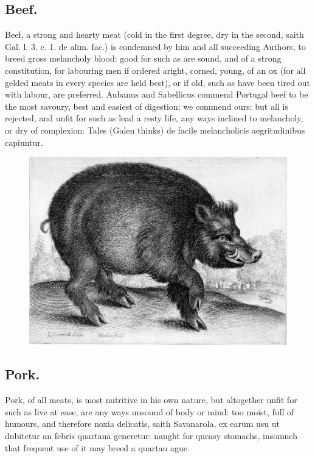 {{\subsection{Beef.}
Beef, a strong and hearty meat (cold in the first degree, dry
in the second, saith Gal. l. 3. c. 1. de alim. fac.) is condemned by
him and all succeeding Authors, to breed gross melancholy blood: good
for such as are sound, and of a strong constitution, for labouring men
if ordered aright, corned, young, of an ox (for all gelded meats in
every species are held best), or if old, such as have been tired
out with labour, are preferred. Aubanus and Sabellicus commend Portugal
beef to be the most savoury, best and easiest of digestion; we commend
ours: but all is rejected, and unfit for such as lead a resty life, any
ways inclined to melancholy, or dry of complexion: Tales (Galen thinks)
de facile melancholicis aegritudinibus capiuntur.
\begin{figure}[H]
  \begingroup
  \centering
  \includegraphics[keepaspectratio,width=\textwidth]{figures/wild-boar-small.jpg}
  \label{fig:wildboar}
\end{figure}
\subsection{Pork.}
Pork, of all meats, is most nutritive in his own nature,
 but altogether unfit for such as live at ease, are any ways
unsound of body or mind: too moist, full of humours, and therefore
noxia delicatis, saith Savanarola, ex earum usu ut dubitetur an febris
quartana generetur: naught for queasy stomachs, insomuch that frequent
use of it may breed a quartan ague.
}}
